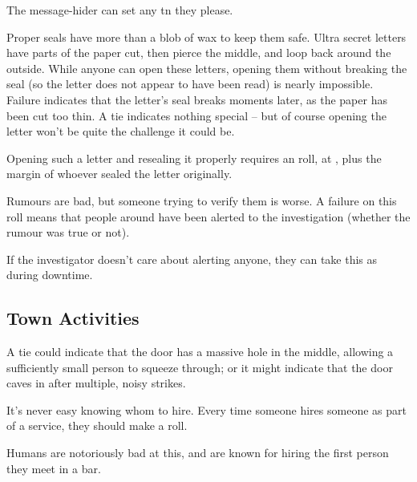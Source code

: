 \begin{multicols}{2}

The message-hider can set any \gls{tn} they please.

Proper seals have more than a blob of wax to keep them safe.
Ultra secret letters have parts of the paper cut, then pierce the middle, and loop back around the outside.
While anyone can open these letters, opening them without breaking the seal (so the letter does not appear to have been read) is nearly impossible.
Failure indicates that the letter's seal breaks moments later, as the paper has been cut too thin.
A tie indicates nothing special -- but of course opening the letter won't be quite the challenge it could be.

Opening such a letter and resealing it properly requires an  roll, at \tn[14], plus the margin of whoever sealed the letter originally.

Rumours are bad, but someone trying to verify them is worse.
A failure on this roll means that people around have been alerted to the investigation (whether the rumour was true or not).

If the investigator doesn't care about alerting anyone, they can take this as  during \gls{downtime}.

\subsection{Town Activities}

A tie could indicate that the door has a massive hole in the middle, allowing a sufficiently small person to squeeze through; or it might indicate that the door caves in after multiple, noisy strikes.

It's never easy knowing whom to hire.
Every time someone hires someone as part of a service, they should make a roll.

Humans are notoriously bad at this, and are known for hiring the first person they meet in a bar.


\end{multicols}
